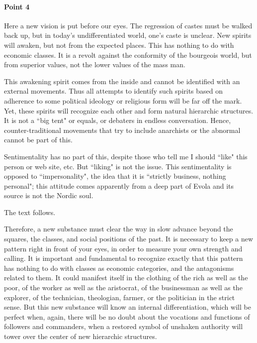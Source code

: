 \paragraph{Point 4}
\begin{quotex}
Here a new vision is put before our eyes. The regression of castes must be walked back up, but in today's undifferentiated world, one's caste is unclear. New spirits will awaken, but not from the expected places. This has nothing to do with economic classes. It is a revolt against the conformity of the bourgeois world, but from superior values, not the lower values of the mass man.

This awakening spirit comes from the inside and cannot be identified with an external movements. Thus all attempts to identify such spirits based on adherence to some political ideology or religious form will be far off the mark. Yet, these spirits will recognize each other and form natural hierarchic structures. It is not a ``big tent" or equals, or debaters in endless conversation. Hence, counter-traditional movements that try to include anarchists or the abnormal cannot be part of this.

Sentimentality has no part of this, despite those who tell me I should ``like" this person or web site, etc. But ``liking" is not the issue. This sentimentality is opposed to ``impersonality", the idea that it is ``strictly business, nothing personal"; this attitude comes apparently from a deep part of Evola and its source is not the Nordic soul.

The text follows. 

\end{quotex}
Therefore, a new substance must clear the way in slow advance beyond the squares, the classes, and social positions of the past. It is necessary to keep a new pattern right in front of your eyes, in order to measure your own strength and calling. It is important and fundamental to recognize exactly that this pattern has nothing to do with classes as economic categories, and the antagonisms related to them. It could manifest itself in the clothing of the rich as well as the poor, of the worker as well as the aristocrat, of the businessman as well as the explorer, of the technician, theologian, farmer, or the politician in the strict sense. But this new substance will know an internal differentiation, which will be perfect when, again, there will be no doubt about the vocations and functions of followers and commanders, when a restored symbol of unshaken authority will tower over the center of new hierarchic structures.

